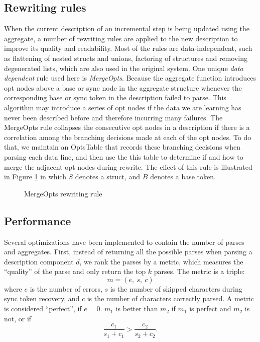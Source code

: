 \subsection{Rewriting rules}
When the current description of an incremental step is being updated
using the aggregate, a number of rewriting rules are applied to the new
description to improve its quality and readability. Most of the rules are
data-independent, such as flattening of nested structs and unions, factoring
of structures and removing degenerated lists, which are also used in the 
original \learnpads{} system. One unique {\em data dependent} rule used here
is {\em MergeOpts}. Because the aggregate function
introduces opt nodes above a base or sync node in the aggregate structure
whenever the corresponding base or sync token in the description failed to 
parse. This algorithm may introduce a series of opt nodes if the data we
are learning has never been described before and therefore incurring many
failures. The MergeOpts rule collapses the consecutive opt nodes in a 
description if there is a correlation among the branching decisions made
at each of the opt nodes. To do that, we maintain an OptsTable that records
these branching decisions when parsing each data line, and then use the
this table to determine if and how to merge the adjacent opt nodes during
rewrite. The effect of this rule is illustrated in 
Figure \ref{fig:opts} in which
$S$ denotes a struct, and $B$ denotes a base token.

\begin{figure}[t]
\begin{center}
\caption{MergeOpts rewriting rule}\label{fig:opts}
\end{center}
\end{figure}


\subsection{Performance}
Several optimizations have been implemented to contain the number of
parses and aggregates. First, instead of returning all the possible
parses when parsing a description component $d$, 
we rank the parses by a metric, which
measures the ``quality'' of the parse and only return the top $k$
parses. The metric is a triple:
\[m = (e,~ s,~ c)\]
where $e$ is the number of errors, $s$ is the number of skipped
characters during sync token recovery, and $c$ is the number
of characters correctly parsed. A metric is considered ``perfect'', if $e = 0$.
$m_1$ is better than $m_2$ if $m_1$ is perfect and $m_2$ is not, or
if 
\[\frac{c_1}{s_1+c_1} > \frac{c_2}{s_2 + c_2}.\]

